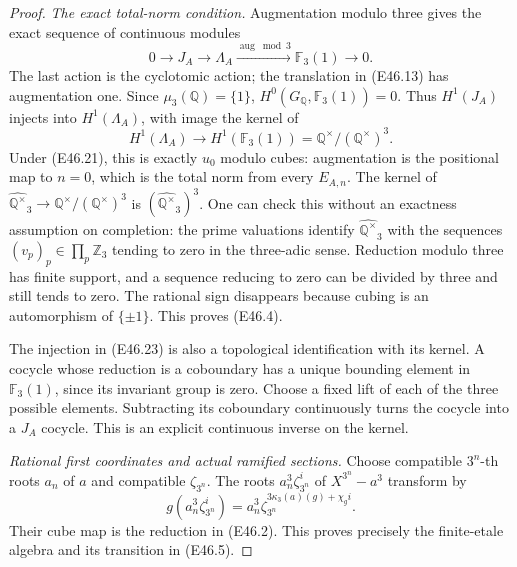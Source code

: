 \begin{proof}
\emph{The exact total-norm condition.}
Augmentation modulo three gives the exact sequence
of continuous modules
\[
        0\longrightarrow J_A\longrightarrow\Lambda_A
          \xrightarrow{\operatorname{aug}\bmod3}
                     \mathbb F_3(1)\longrightarrow0.
 \tag{E46.22}
\]
The last action is the cyclotomic action; the
translation in (E46.13) has augmentation one.
Since $\mu_3(\mathbb Q)=\{1\}$,
$H^0(G_{\mathbb Q},\mathbb F_3(1))=0$.
Thus $H^1(J_A)$ injects into $H^1(\Lambda_A)$,
with image the kernel of
\[
 H^1(\Lambda_A)\longrightarrow H^1(\mathbb F_3(1))
                     =\mathbb Q^\times/(\mathbb Q^\times)^3.
 \tag{E46.23}
\]
Under (E46.21), this is exactly $u_0$ modulo cubes:
augmentation is the positional map to $n=0$,
which is the total norm from every $E_{A,n}$.
The kernel of
$\widehat{\mathbb Q^\times}_3\to
\mathbb Q^\times/(\mathbb Q^\times)^3$
is $(\widehat{\mathbb Q^\times}_3)^3$.
One can check this without an exactness assumption
on completion: the prime valuations identify
$\widehat{\mathbb Q^\times}_3$ with the sequences
$(v_p)_p\in\prod_p\mathbb Z_3$ tending to zero in
the three-adic sense. Reduction modulo three
has finite support, and a sequence reducing to
zero can be divided by three and still tends
to zero. The rational sign disappears because
cubing is an automorphism of $\{\pm1\}$.
This proves (E46.4).

The injection in (E46.23) is also a topological
identification with its kernel. A cocycle whose
reduction is a coboundary has a unique bounding
element in $\mathbb F_3(1)$, since its invariant
group is zero. Choose a fixed lift of each of
the three possible elements. Subtracting its
coboundary continuously turns the cocycle into
a $J_A$ cocycle. This is an explicit continuous
inverse on the kernel.

\emph{Rational first coordinates and actual ramified sections.}
Choose compatible $3^n$-th roots $a_n$ of $a$ and
compatible $\zeta_{3^n}$. The roots
$a_n^3\zeta_{3^n}^i$ of $X^{3^n}-a^3$ transform by
\[
 g(a_n^3\zeta_{3^n}^i)
     =a_n^3\zeta_{3^n}^{3\kappa_3(a)(g)+\chi_g i}.
\]
Their cube map is the reduction in (E46.2).
This proves precisely the finite-etale algebra
and its transition in (E46.5).


\end{proof}
